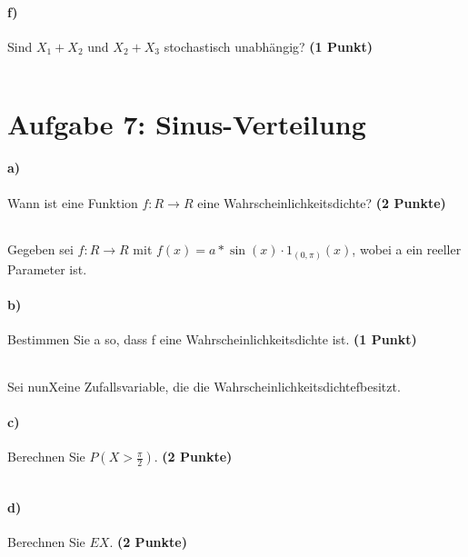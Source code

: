 \documentclass[10pt, a4paper]{article}
\begin{document}
\paragraph{f)} Sind $X_1+X_2$ und $X_2+X_3$ stochastisch unabhängig? \textbf{(1 Punkt)}\\
\begin{tabular}{| p{17cm} |}
    \hline
    \\\hline
\end{tabular}

\section{Aufgabe 7: Sinus-Verteilung}
\paragraph{a)} Wann ist eine Funktion $f:R\rightarrow R$ eine Wahrscheinlichkeitsdichte? \textbf{(2 Punkte)}\\
\begin{tabular}{| p{17cm} |}
    \hline
    \\\hline
\end{tabular}

Gegeben sei $f:R\rightarrow R$ mit $f(x) =a*\sin(x)·1_{(0,\pi)}(x)$, wobei a ein reeller Parameter ist.
\paragraph{b)} Bestimmen Sie a so, dass f eine Wahrscheinlichkeitsdichte ist. \textbf{(1 Punkt)}\\
\begin{tabular}{| p{17cm} |}
    \hline
    \\\hline
\end{tabular}

Sei nunXeine Zufallsvariable, die die Wahrscheinlichkeitsdichtefbesitzt.
\paragraph{c)} Berechnen Sie $P(X >\frac{\pi}{2})$. \textbf{(2 Punkte)}\\
\begin{tabular}{| p{17cm} |}
    \hline
    \\\hline
\end{tabular}

\paragraph{d)} Berechnen Sie $E X$. \textbf{(2 Punkte)}\\
\begin{tabular}{| p{17cm} |}
    \hline
    \\\hline
\end{tabular}
\end{document}
